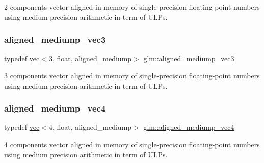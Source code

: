 2 components vector aligned in memory of single-\/precision floating-\/point numbers using medium precision arithmetic in term of U\+L\+Ps. 

\mbox{\label{group__gtc__type__aligned_ga1c5c37a497fa004afa060bd173b20447}} 
\subsubsection{\texorpdfstring{aligned\+\_\+mediump\+\_\+vec3}{aligned\_mediump\_vec3}}
{\footnotesize\ttfamily typedef \hyperlink{structglm_1_1vec}{vec}$<$3, float, aligned\+\_\+mediump$>$ \hyperlink{group__gtc__type__aligned_ga1c5c37a497fa004afa060bd173b20447}{glm\+::aligned\+\_\+mediump\+\_\+vec3}}



3 components vector aligned in memory of single-\/precision floating-\/point numbers using medium precision arithmetic in term of U\+L\+Ps. 

\mbox{\label{group__gtc__type__aligned_ga83fa079eb8188b8acb4e90589ce5dddb}} 
\subsubsection{\texorpdfstring{aligned\+\_\+mediump\+\_\+vec4}{aligned\_mediump\_vec4}}
{\footnotesize\ttfamily typedef \hyperlink{structglm_1_1vec}{vec}$<$4, float, aligned\+\_\+mediump$>$ \hyperlink{group__gtc__type__aligned_ga83fa079eb8188b8acb4e90589ce5dddb}{glm\+::aligned\+\_\+mediump\+\_\+vec4}}



4 components vector aligned in memory of single-\/precision floating-\/point numbers using medium precision arithmetic in term of U\+L\+Ps. 

